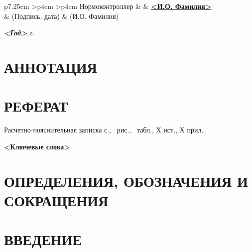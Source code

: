 \documentclass[utf8x, 14pt, oneside, a4paper]{article}
\newenvironment{signstabular}[1][1]{
	\renewcommand*{\arraystretch}{#1}
	\tabular
}{
	\endtabular
}
\begin{document}
\begin{titlepage}
\begin{table}[h!]
			\vspace{\baselineskip}

			\begin{signstabular}[0.7]{p{7.25cm} >{\centering\arraybackslash}p{4cm} >{\centering\arraybackslash}p{4cm}}
				Нормоконтроллер & \uline{\hspace*{4cm}} & \uline{\hfill \textbf{<И.О. Фамилия>} \hfill} \\
				& \scriptsize (Подпись, дата) & \scriptsize (И.О. Фамилия)
			\end{signstabular}
		\end{table}

		\vfill

		\begin{center}
			\normalsize \textit{\textbf{<Год>} г.}
		\end{center}
	\end{titlepage}

	\normalsize
	\setcounter{page}{4}
	\section*{АННОТАЦИЯ}

	\pagebreak

	\section*{РЕФЕРАТ}
		\begin{center}
			Расчетно-пояснительная записка \pageref{LastPage} с., \totalfigures\ рис., \totaltables\ табл., Х ист., Х прил.

			\textbf{<Ключевые слова>}
		\end{center}

		\pagebreak

	\renewcommand{\contentsname}{\normalsize\bfseries\centering СОДЕРЖАНИЕ}
	\small
	\tableofcontents
	\normalsize

		\pagebreak

	\section*{ОПРЕДЕЛЕНИЯ, ОБОЗНАЧЕНИЯ И СОКРАЩЕНИЯ}

		\pagebreak

	\section*{ВВЕДЕНИЕ}
\end{document}
